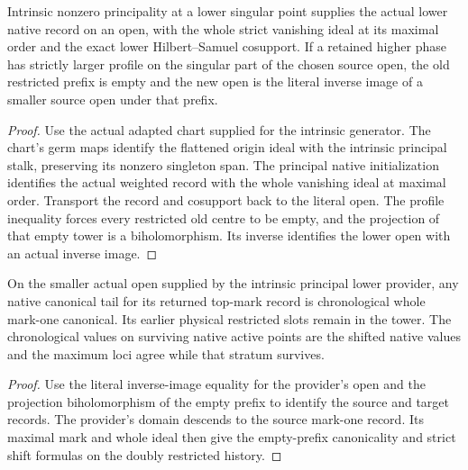 \begin{theorem}
\label{hir:g8-restarted-principal-provider}
\leanok
Intrinsic nonzero principality at a lower singular point supplies
the actual lower native record on an open, with the whole strict
vanishing ideal at its maximal order and the exact lower
Hilbert--Samuel cosupport. If a retained higher phase has strictly
larger profile on the singular part of the chosen source open, the
old restricted prefix is empty and the new open is the literal
inverse image of a smaller source open under that prefix.
\end{theorem}
\begin{proof}
Use the actual adapted chart supplied for the intrinsic generator.
The chart's germ maps identify the flattened origin ideal with the
intrinsic principal stalk, preserving its nonzero singleton span.
The principal native initialization identifies the actual weighted
record with the whole vanishing ideal at maximal order. Transport
the record and cosupport back to the literal open. The profile
inequality forces every restricted old centre to be empty, and the
projection of that empty tower is a biholomorphism. Its inverse
identifies the lower open with an actual inverse image.
\end{proof}

\begin{theorem}
\label{hir:g8-actual-principal-restart}
\leanok
On the smaller actual open supplied by the intrinsic principal
lower provider, any native canonical tail for its returned top-mark
record is chronological whole mark-one canonical. Its earlier
physical restricted slots remain in the tower. The chronological
values on surviving native active points are the shifted native
values and the maximum loci agree while that stratum survives.
\end{theorem}
\begin{proof}
Use the literal inverse-image equality for the provider's open
and the projection biholomorphism of the empty prefix to identify
the source and target records. The provider's domain descends to
the source mark-one record. Its maximal mark and whole ideal
then give the empty-prefix canonicality and strict shift formulas
on the doubly restricted history.
\end{proof}

